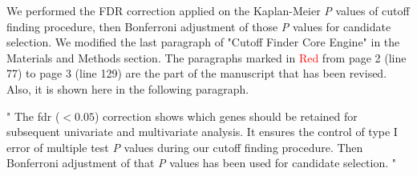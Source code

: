 \documentclass[preprint,12pt]{elsarticle}
\newenvironment{MyIndent}
{\par\leftskip1cm\relax\rightskip1cm\relax}
{\par\leftskip0cm\relax\rightskip0cm\relax}
\newenvironment{MyColorPar}[1]{%
    \leavevmode\color{#1}\ignorespaces%
}{%
}%
\begin{document}
\begin{MyColorPar}{blue}
We performed the FDR correction applied on the Kaplan-Meier \textit{P} values of cutoff finding procedure, then Bonferroni adjustment of those \textit{P} values for candidate selection.
We modified the last paragraph of "Cutoff Finder Core Engine" in the Materials and Methods section.
The paragraphs marked in \textcolor{red}{Red} from page 2 (line 77) to page 3 (line 129) are the part of the manuscript that has been revised. Also, it is shown here in the following paragraph.
\\[0.3cm]


\begin{MyIndent}
\begin{MyColorPar}{red}

"
The \acrfull{fdr} ($< 0.05$) correction\cite{Benjamini1995a} shows which genes should be retained for subsequent univariate and multivariate analysis.
It ensures the control of type I error of multiple test \textit{P} values during our cutoff finding procedure.
Then Bonferroni adjustment of that \textit{P} values has been used for candidate selection.
"
\end{MyColorPar} %
\end{MyIndent}

\end{MyColorPar}
\end{document}
